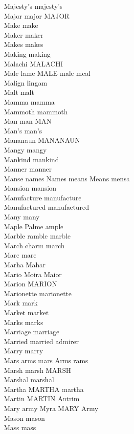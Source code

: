 Majesty's majesty's\\
Major major MAJOR\\
Make make\\
Maker maker\\
Makes makes\\
Making making\\
Malachi MALACHI\\
Male lame MALE male meal\\
Malign lingam\\
Malt malt\\
Mamma mamma\\
Mammoth mammoth\\
Man man MAN\\
Man's man's\\
Mananaun MANANAUN\\
Mangy mangy\\
Mankind mankind\\
Manner manner\\
Manse names Names means Means mensa\\
Mansion mansion\\
Manufacture manufacture\\
Manufactured manufactured\\
Many many\\
Maple Palme ample\\
Marble ramble marble\\
March charm march\\
Mare mare\\
Marha Mahar\\
Mario Moira Maior\\
Marion MARION\\
Marionette marionette\\
Mark mark\\
Market market\\
Marks marks\\
Marriage marriage\\
Married married admirer\\
Marry marry\\
Mars arms mars Arms rams\\
Marsh marsh MARSH\\
Marshal marshal\\
Martha MARTHA martha\\
Martin MARTIN Antrim\\
Mary army Myra MARY Army\\
Mason mason\\
Mass mass\\
